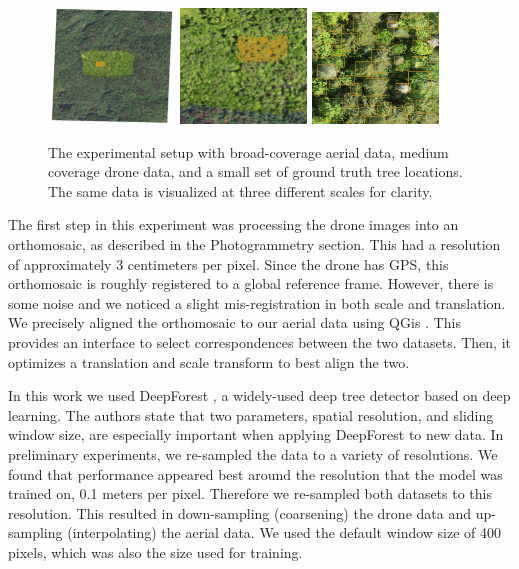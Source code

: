 \begin{figure}
    \centering
    \includegraphics[width=0.3\textwidth]{figs/methods/tree_detection/multiscale_outset.png}
    \includegraphics[width=0.3\textwidth]{figs/methods/tree_detection/multiscale_inset.png}
    \includegraphics[width=0.3\textwidth]{figs/methods/tree_detection/multiscale_in_inset.png}
    \caption{The experimental setup with broad-coverage aerial data, medium coverage drone data, and a small set of ground truth tree locations. The same data is visualized at three different scales for clarity.}
    \label{fig:methods:multi_scale_tree_det}
\end{figure}

The first step in this experiment was processing the drone images into an orthomosaic, as described in the Photogrammetry section. This had a resolution of approximately 3 centimeters per pixel. Since the drone has GPS, this orthomosaic is roughly registered to a global reference frame. However, there is some noise and we noticed a slight mis-registration in both scale and translation. We precisely aligned the orthomosaic to our aerial data using QGis \cite{QGIS_software}. This provides an interface to select correspondences between the two datasets. Then, it optimizes a translation and scale transform to best align the two. 

In this work we used DeepForest \cite{Weinstein2020DeepForest:Delineation}, a widely-used deep tree detector based on deep learning.
The authors state that two parameters, spatial resolution, and sliding window size, are especially important when applying DeepForest to new data. In preliminary experiments, we re-sampled the data to a variety of resolutions. We found that performance appeared best around the resolution that the model was trained on, 0.1 meters per pixel. Therefore we re-sampled both datasets to this resolution. This resulted in down-sampling (coarsening) the drone data and up-sampling (interpolating) the aerial data. We used the default window size of 400 pixels, which was also the size used for training.

